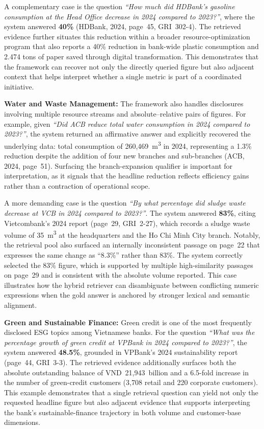 \documentclass[sn-mathphys, oneside]{sn-jnl}
\begin{document}
A complementary case is the question \textit{``How much did HDBank's
gasoline consumption at the Head Office decrease in 2024 compared to
2023?''}, where the system answered \textbf{40\%} (HDBank, 2024, page~45,
GRI~302-4). The retrieved evidence further situates this reduction within a
broader resource-optimization program that also reports a 40\% reduction in
bank-wide plastic consumption and 2.474 tons of paper saved through digital
transformation. This demonstrates that the framework can recover not only
the directly queried figure but also adjacent context that helps interpret
whether a single metric is part of a coordinated initiative.
 
\textbf{Water and Waste Management: }The framework also handles disclosures involving multiple resource streams
and absolute--relative pairs of figures. For example, given \textit{``Did
ACB reduce total water consumption in 2024 compared to 2023?''}, the system
returned an affirmative answer and explicitly recovered the underlying
data: total consumption of 260{,}469~m\textsuperscript{3} in 2024,
representing a 1.3\% reduction despite the addition of four new branches
and sub-branches (ACB, 2024, page~51). Surfacing the branch-expansion
qualifier is important for interpretation, as it signals that the headline
reduction reflects efficiency gains rather than a contraction of operational
scope.
 
A more demanding case is the question \textit{``By what percentage did
sludge waste decrease at VCB in 2024 compared to 2023?''}. The system
answered \textbf{83\%}, citing Vietcombank's 2024 report (page~29,
GRI~2-27), which records a sludge waste volume of 35~m\textsuperscript{3}
at the headquarters and the Ho Chi Minh City branch. Notably, the retrieval
pool also surfaced an internally inconsistent passage on page~22 that
expresses the same change as ``8.3\%'' rather than 83\%. The system
correctly selected the 83\% figure, which is supported by multiple
high-similarity passages on page~29 and is consistent with the absolute
volume reported. This case illustrates how the hybrid retriever can
disambiguate between conflicting numeric expressions when the gold answer
is anchored by stronger lexical and semantic alignment.
 
\textbf{Green and Sustainable Finance: }Green credit is one of the most frequently disclosed ESG topics among
Vietnamese banks. For the question \textit{``What was the percentage growth
of green credit at VPBank in 2024 compared to 2023?''}, the system answered
\textbf{48.5\%}, grounded in VPBank's 2024 sustainability report (page~44,
GRI~3-3). The retrieved evidence additionally surfaces both the absolute
outstanding balance of VND~21{,}943~billion and a 6.5-fold increase in
the number of green-credit customers (3{,}708 retail and 220 corporate
customers). This example demonstrates that a single retrieval question can
yield not only the requested headline figure but also adjacent evidence
that supports interpreting the bank's sustainable-finance trajectory in
both volume and customer-base dimensions.
 
\end{document}
